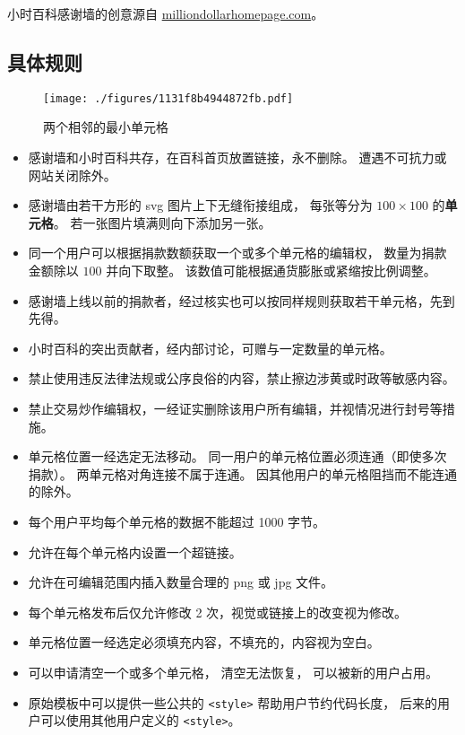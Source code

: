 
\begin{issues}
\issueDraft
{}
\end{issues}

小时百科感谢墙的创意源自 \href{http://www.milliondollarhomepage.com}{milliondollarhomepage.com}。

\subsection{具体规则}

\begin{figure}[ht]
\centering
\texttt{[image: ./figures/1131f8b4944872fb.pdf]}
\caption{两个相邻的最小单元格} \label{fig_thanks_1}
\end{figure}

\begin{itemize}
\item 感谢墙和小时百科共存，在百科首页放置链接，永不删除。 遭遇不可抗力或网站关闭除外。
\item 感谢墙由若干方形的 svg 图片上下无缝衔接组成， 每张等分为 $100\times 100$ 的\textbf{单元格}。 若一张图片填满则向下添加另一张。
\item 同一个用户可以根据捐款数额获取一个或多个单元格的编辑权， 数量为捐款金额除以 $100$ 并向下取整。 该数值可能根据通货膨胀或紧缩按比例调整。
\item 感谢墙上线以前的捐款者，经过核实也可以按同样规则获取若干单元格，先到先得。
\item 小时百科的突出贡献者，经内部讨论，可赠与一定数量的单元格。
\item 禁止使用违反法律法规或公序良俗的内容，禁止擦边涉黄或时政等敏感内容。
\item 禁止交易炒作编辑权，一经证实删除该用户所有编辑，并视情况进行封号等措施。
\item 单元格位置一经选定无法移动。 同一用户的单元格位置必须连通（即使多次捐款）。 两单元格对角连接不属于连通。 因其他用户的单元格阻挡而不能连通的除外。
\item 每个用户平均每个单元格的数据不能超过 1000 字节。
\item 允许在每个单元格内设置一个超链接。
\item 允许在可编辑范围内插入数量合理的 png 或 jpg 文件。
\item 每个单元格发布后仅允许修改 2 次，视觉或链接上的改变视为修改。
\item 单元格位置一经选定必须填充内容，不填充的，内容视为空白。
\item 可以申请清空一个或多个单元格， 清空无法恢复， 可以被新的用户占用。
\item 原始模板中可以提供一些公共的 \verb`<style>` 帮助用户节约代码长度， 后来的用户可以使用其他用户定义的 \verb`<style>`。
\end{itemize}
